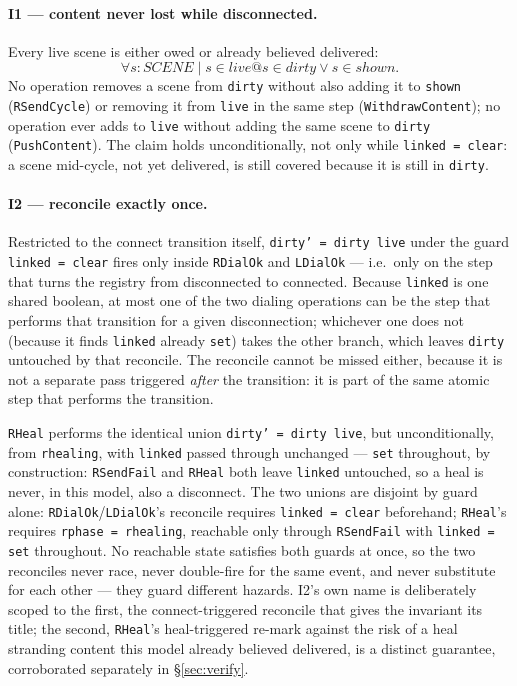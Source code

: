 \documentclass[a4paper,10pt,fleqn]{article}
\begin{document}
\paragraph{I1 --- content never lost while disconnected.}
Every live scene is either owed or already believed delivered:
\[
  \forall s : SCENE \mid s \in live @ s \in dirty \lor s \in shown.
\]
No operation removes a scene from \texttt{dirty} without also adding it to
\texttt{shown} (\texttt{RSendCycle}) or removing it from \texttt{live} in
the same step (\texttt{WithdrawContent}); no operation ever adds to
\texttt{live} without adding the same scene to \texttt{dirty}
(\texttt{PushContent}).  The claim holds unconditionally, not only while
\texttt{linked = clear}: a scene mid-cycle, not yet delivered, is still
covered because it is still in \texttt{dirty}.

\paragraph{I2 --- reconcile exactly once.}
Restricted to the connect transition itself, \texttt{dirty' = dirty \cup
live} under the guard \texttt{linked = clear} fires only inside
\texttt{RDialOk} and \texttt{LDialOk} --- i.e.\ only on the step that
turns the registry from disconnected to connected.  Because \texttt{linked}
is one shared boolean, at most one of the two dialing operations can be
the step that performs that transition for a given disconnection;
whichever one does not (because it finds \texttt{linked} already
\texttt{set}) takes the other branch, which leaves \texttt{dirty}
untouched by that reconcile.  The reconcile cannot be missed either,
because it is not a separate pass triggered \emph{after} the transition:
it is part of the same atomic step that performs the transition.

\texttt{RHeal} performs the identical union \texttt{dirty' = dirty \cup
live}, but unconditionally, from \texttt{rhealing}, with \texttt{linked}
passed through unchanged --- \texttt{set} throughout, by construction:
\texttt{RSendFail} and \texttt{RHeal} both leave \texttt{linked}
untouched, so a heal is never, in this model, also a disconnect.  The two
unions are disjoint by guard alone: \texttt{RDialOk}/\texttt{LDialOk}'s
reconcile requires \texttt{linked = clear} beforehand; \texttt{RHeal}'s
requires \texttt{rphase = rhealing}, reachable only through
\texttt{RSendFail} with \texttt{linked = set} throughout.  No reachable
state satisfies both guards at once, so the two reconciles never race,
never double-fire for the same event, and never substitute for each
other --- they guard different hazards.  I2's own name is deliberately
scoped to the first, the connect-triggered reconcile that gives the
invariant its title; the second, \texttt{RHeal}'s heal-triggered re-mark
against the risk of a heal stranding content this model already believed
delivered, is a distinct guarantee, corroborated separately in
\S\ref{sec:verify}.
\end{document}
